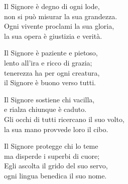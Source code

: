 

\spazio

\strofa Il Signore è degno di ogni lode,\\
non si può misurar la sua grandezza.\\
Ogni vivente proclami la sua gloria,\\
la sua opera è giustizia e verità.

\spazio


\spazio

\strofa Il Signore è paziente e pietoso,\\
lento all'ira e ricco di grazia;\\
tenerezza ha per ogni creatura,\\
il Signore è buono verso tutti.

\spazio


\spazio

\strofa Il Signore sostiene chi vacilla,\\
e rialza chiunque è caduto.\\
Gli occhi di tutti ricercano il suo volto,\\
la sua mano provvede loro il cibo.

\spazio


\spazio

\strofa Il Signore protegge chi lo teme\\
ma disperde i superbi di cuore;\\
Egli ascolta il grido del suo servo,\\
ogni lingua benedica il suo nome.

\spazio

